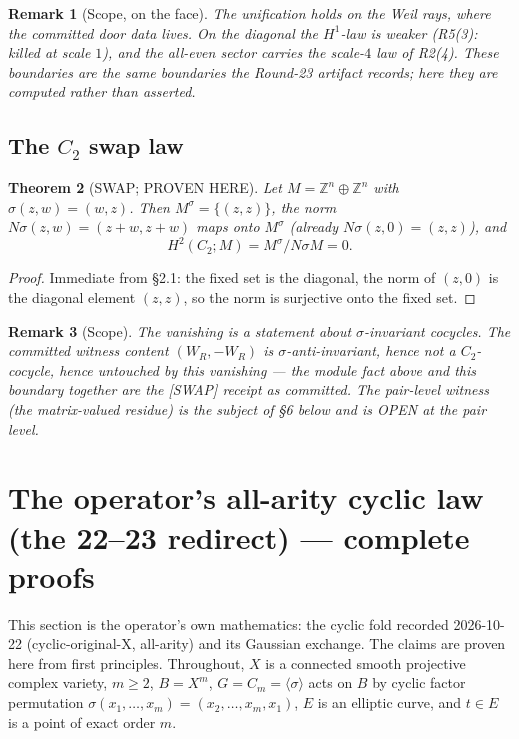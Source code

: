 \documentclass[11pt]{article}
\newtheorem{theorem}{Theorem}
\newtheorem{remark}[theorem]{Remark}
\newcommand{\Z}{\mathbb Z}
\begin{document}
\begin{remark}[Scope, on the face]
The unification holds on the Weil rays, where the committed door data
lives. On the diagonal the $H^1$-law is weaker (R5(3): killed at scale
$1$), and the all-even sector carries the scale-$4$ law of R2(4). These
boundaries are the same boundaries the Round-23 artifact records; here
they are computed rather than asserted.
\end{remark}

\subsection{The $C_2$ swap law}

\begin{theorem}[SWAP; PROVEN HERE]
Let $M=\Z^n\oplus\Z^n$ with $\sigma(z,w)=(w,z)$. Then
$M^{\sigma}=\{(z,z)\}$, the norm $N\sigma(z,w)=(z+w,z+w)$ maps onto
$M^{\sigma}$ (already $N\sigma(z,0)=(z,z)$), and
\[
H^2(C_2;M)=M^{\sigma}/N\sigma M=0 .
\]
\end{theorem}

\begin{proof}
Immediate from \S2.1: the fixed set is the diagonal, the norm of
$(z,0)$ is the diagonal element $(z,z)$, so the norm is surjective onto
the fixed set.
\end{proof}

\begin{remark}[Scope]
The vanishing is a statement about $\sigma$-invariant cocycles. The
committed witness content $(W_R,-W_R)$ is $\sigma$-anti-invariant, hence
not a $C_2$-cocycle, hence untouched by this vanishing --- the module
fact above and this boundary together are the [SWAP] receipt as
committed. The pair-level witness (the matrix-valued residue) is the
subject of \S6 below and is OPEN at the pair level.
\end{remark}

\section{The operator's all-arity cyclic law (the 22--23 redirect) --- complete proofs}

This section is the operator's own mathematics: the cyclic fold recorded
2026-10-22 (cyclic-original-X, all-arity) and its Gaussian exchange. The
claims are proven here from first principles. Throughout, $X$ is a
connected smooth projective complex variety, $m\ge2$,
$B=X^m$, $G=C_m=\langle\sigma\rangle$ acts on $B$ by cyclic factor
permutation $\sigma(x_1,\dots,x_m)=(x_2,\dots,x_m,x_1)$, $E$ is an
elliptic curve, and $t\in E$ is a point of exact order $m$.
\end{document}
